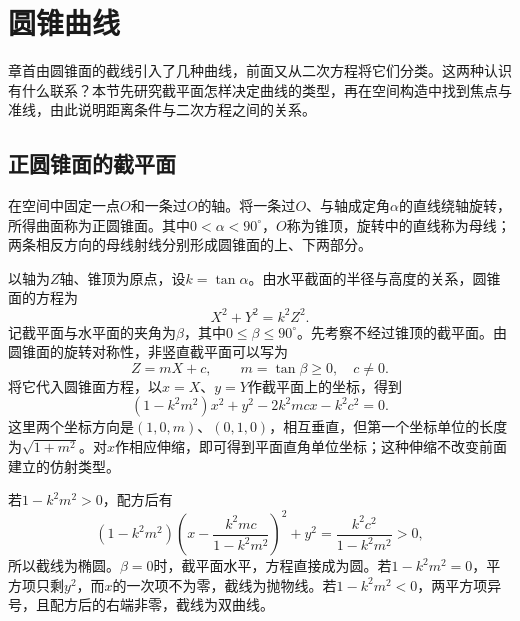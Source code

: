﻿\newpage
\section{圆锥曲线}
\label{sec:quadratic-conic-sections}

章首由圆锥面的截线引入了几种曲线，前面又从二次方程将它们分类。这两种认识有什么联系？本节先研究截平面怎样决定曲线的类型，再在空间构造中找到焦点与准线，由此说明距离条件与二次方程之间的关系。

\subsection{正圆锥面的截平面}
\label{subsec:quadratic-plane-sections}

在空间中固定一点\(O\)和一条过\(O\)的轴。将一条过\(O\)、与轴成定角\(\alpha\)的直线绕轴旋转，所得曲面称为{\heiti{}正圆锥面}。其中\(0<\alpha<90^\circ\)，\(O\)称为锥顶，旋转中的直线称为母线；两条相反方向的母线射线分别形成圆锥面的上、下两部分。

以轴为\(Z\)轴、锥顶为原点，设\(k=\tan\alpha\)。由水平截面的半径与高度的关系，圆锥面的方程为
\begin{equation}\label{eq:quadratic-cone-equation}
    X^2+Y^2=k^2Z^2 .
\end{equation}
记截平面与水平面的夹角为\(\beta\)，其中\(0\le\beta\le90^\circ\)。先考察不经过锥顶的截平面。由圆锥面的旋转对称性，非竖直截平面可以写为
\begin{equation*}
    Z=mX+c , \qquad m=\tan\beta\ge0 , \quad c\ne0 .
\end{equation*}
将它代入圆锥面方程，以\(x=X\)、\(y=Y\)作截平面上的坐标，得到
\begin{equation}\label{eq:quadratic-cone-section-substitution}
    (1-k^2m^2)x^2+y^2-2k^2mcx-k^2c^2=0 .
\end{equation}
这里两个坐标方向是\((1,0,m)\)、\((0,1,0)\)，相互垂直，但第一个坐标单位的长度为\(\sqrt{1+m^2}\)。对\(x\)作相应伸缩，即可得到平面直角单位坐标；这种伸缩不改变前面建立的仿射类型。

若\(1-k^2m^2>0\)，配方后有
\begin{equation*}
    (1-k^2m^2)\left(x-\frac{k^2mc}{1-k^2m^2}\right)^2+y^2
    =\frac{k^2c^2}{1-k^2m^2}>0 ,
\end{equation*}
所以截线为椭圆。\(\beta=0\)时，截平面水平，方程直接成为圆。若\(1-k^2m^2=0\)，平方项只剩\(y^2\)，而\(x\)的一次项不为零，截线为抛物线。若\(1-k^2m^2<0\)，两平方项异号，且配方后的右端非零，截线为双曲线。

